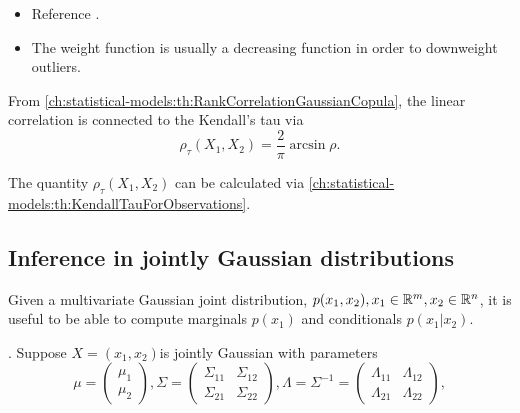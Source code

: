 \begin{refsection}
\begin{remark}\hfill
	\begin{itemize}
		\item Reference \cite[97]{mcneil2015quantitative}.
		\item The weight function is usually a decreasing function in order to downweight outliers.
	\end{itemize}	
	
\end{remark}



\begin{note}\cite[97]{mcneil2015quantitative}
	From \autoref{ch:statistical-models:th:RankCorrelationGaussianCopula}, the linear correlation is connected to the Kendall's tau via
	$$\rho_\tau(X_1,X_2) = \frac{2}{\pi} \arcsin \rho. $$
	
	The quantity $\rho_\tau(X_1,X_2)$ can be calculated via \autoref{ch:statistical-models:th:KendallTauForObservations}. 	
\end{note}

\subsection{Inference in jointly Gaussian distributions}

\begin{remark}
Given a multivariate Gaussian joint distribution, $p(x_1,x_2),x_1\in \mathbb{R}^m, x_2\in \mathbb{R}^n$, it is useful to be able to compute marginals $p(x_1)$ and conditionals $p(x_1|x_2)$. 	
\end{remark}


\begin{theorem}. Suppose $X=(x_1,x_2)$is jointly Gaussian with parameters
	\begin{equation}
	\mu=\left(\begin{array}{c}\mu_1 \\
	\mu_2\end{array}\right),
	\Sigma=\left(\begin{array}{cc}
	\Sigma_{11} & \Sigma_{12} \\
	\Sigma_{21} & \Sigma_{22} \end{array}\right),
	\Lambda=\Sigma^{-1}=\left(\begin{array}{cc}
	\Lambda_{11} & \Lambda_{12} \\
	\Lambda_{21} & \Lambda_{22} \end{array}\right),
	\end{equation}
	

\end{theorem}
\end{refsection}
